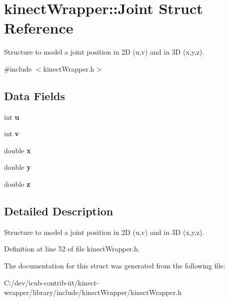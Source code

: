 \section{kinect\+Wrapper\+:\+:Joint Struct Reference}
\label{structkinectWrapper_1_1Joint}


Structure to model a joint position in 2\+D (u,v) and in 3\+D (x,y,z).  




{\ttfamily \#include $<$kinect\+Wrapper.\+h$>$}

\subsection*{Data Fields}
\begin{DoxyCompactItemize}
\item 
int {\bfseries u}\label{structkinectWrapper_1_1Joint_a8ed49e3df7ad96e08302a55f0254e6dc}

\item 
int {\bfseries v}\label{structkinectWrapper_1_1Joint_a3abbe494241126336a73e2c5cce4e455}

\item 
double {\bfseries x}\label{structkinectWrapper_1_1Joint_a427ceeb404a1a46e5d7e98566505ad29}

\item 
double {\bfseries y}\label{structkinectWrapper_1_1Joint_a45a9ab5ca36f6e39bcb0d8cd01249fef}

\item 
double {\bfseries z}\label{structkinectWrapper_1_1Joint_aff60e74868c4241a592ae7eb05ab5176}

\end{DoxyCompactItemize}


\subsection{Detailed Description}
Structure to model a joint position in 2\+D (u,v) and in 3\+D (x,y,z). 

Definition at line 52 of file kinect\+Wrapper.\+h.



The documentation for this struct was generated from the following file\+:\begin{DoxyCompactItemize}
\item 
C\+:/dev/icub-\/contrib-\/iit/kinect-\/wrapper/library/include/kinect\+Wrapper/kinect\+Wrapper.\+h\end{DoxyCompactItemize}

